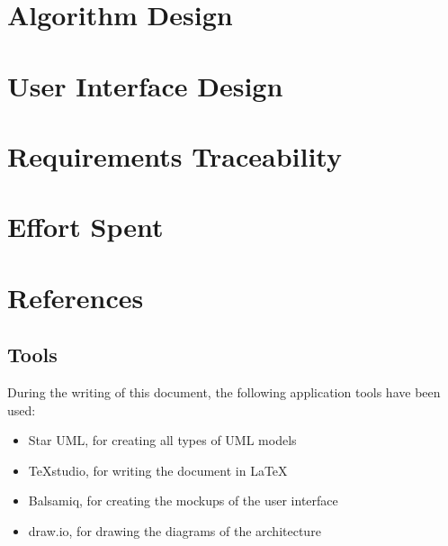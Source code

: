 \documentclass[11pt,a4paper]{report}
\begin{document}
\chapter{Algorithm Design}
\chapter{User Interface Design}
\chapter{Requirements Traceability}
\chapter{Effort Spent}
\chapter{References}
\section{Tools}
During the writing of this document, the following application tools have been used:
\begin{itemize}
	\item Star UML, for creating all types of UML models
	\item TeXstudio, for writing the document in \LaTeX
	\item Balsamiq, for creating the mockups of the user interface
	\item draw.io, for drawing the diagrams of the architecture
\end{itemize}
\end{document}
